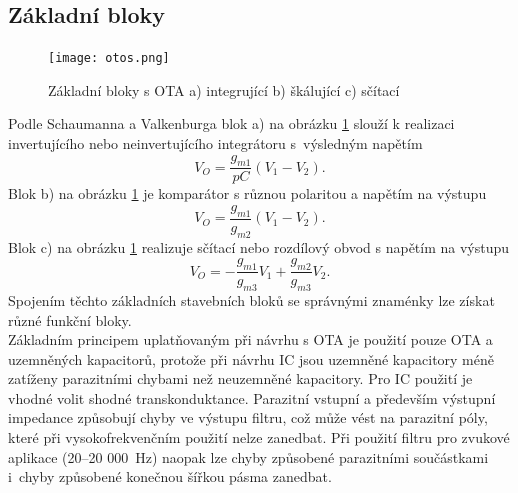 \subsection{Základní bloky}
\begin{figure}[h]
\centering
\texttt{[image: otos.png]}
\caption[Základní bloky s OTA]{Základní bloky s OTA a) integrující b) škálující c) sčítací \label{s:BLO}}
\end{figure}
\noindent Podle Schaumanna a Valkenburga \cite{13} blok a) na obrázku \ref{s:BLO} slouží k realizaci invertujícího nebo neinvertujícího integrátoru s~výsledným napětím
\begin{equation}
V_O = \frac{g_{m1}}{pC}(V_1 - V_2).
\end{equation}
Blok b) na obrázku \ref{s:BLO} je komparátor s různou polaritou a napětím na výstupu
\begin{equation}
V_O = \frac{g_{m1}}{g_{m2}}(V_1 - V_2).
\end{equation}
Blok c) na obrázku \ref{s:BLO} realizuje sčítací nebo rozdílový obvod s napětím na výstupu
\begin{equation}
V_O = -\frac{g_{m1}}{g_{m3}}V_1 + \frac{g_{m2}}{g_{m3}}V_2.\label{s:BLO3}
\end{equation}
\noindent Spojením těchto základních stavebních bloků se správnými znaménky lze získat různé funkční bloky.\\
Základním principem uplatňovaným při návrhu s OTA je použití pouze OTA a uzemněných kapacitorů, protože při návrhu IC jsou uzemněné kapacitory méně zatíženy parazitními chybami než neuzemněné kapacitory. Pro IC použití je vhodné volit shodné transkonduktance. Parazitní vstupní a především výstupní impedance způsobují chyby ve výstupu filtru, což může vést na parazitní póly, které při vysokofrekvenčním použití nelze zanedbat. Při použití filtru pro zvukové aplikace (20--20 000~Hz) naopak lze chyby způsobené parazitními součástkami i~chyby způsobené konečnou šířkou pásma zanedbat.
